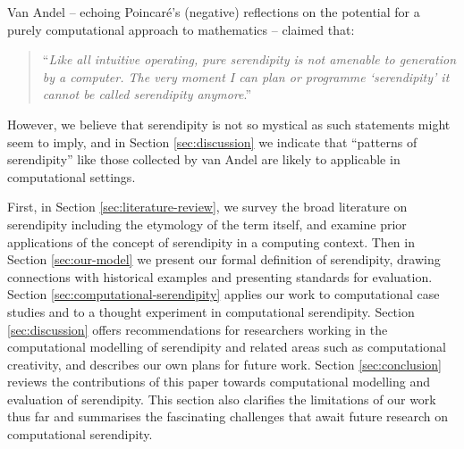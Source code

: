 Van Andel \citeyear{van1994anatomy} -- echoing Poincar\'e's
\citeyear{poincare1910creation} (negative) reflections on the potential
for a purely computational approach to mathematics -- claimed that:
\begin{quote}
``\emph{Like all intuitive operating, pure serendipity is not amenable
    to generation by a computer.  The very moment I can plan or
    programme `serendipity' it cannot be called serendipity
    anymore}.'' \cite{van1994anatomy}
\end{quote}
However, we believe that serendipity is not so mystical as such statements
might seem to imply, and in Section \ref{sec:discussion} we indicate
that ``patterns of serendipity'' like those collected by van Andel
are likely to applicable in computational settings.

First, in
Section \ref{sec:literature-review}, we survey the broad literature on
serendipity including the etymology of the term itself, and examine prior applications of the concept of serendipity in a computing context.  Then in Section \ref{sec:our-model} we present our formal
definition of serendipity, drawing connections with historical examples 
and presenting standards for evaluation.  Section
\ref{sec:computational-serendipity} applies our work to computational case studies and
to a thought experiment in computational serendipity.  Section
\ref{sec:discussion} offers recommendations for researchers working in the computational modelling of serendipity and related areas such as computational creativity, and describes our own plans for future
work.  Section \ref{sec:conclusion} reviews the contributions of this paper towards computational modelling and evaluation of serendipity.  This section also clarifies the limitations of our work thus far and summarises the fascinating challenges that await future research on computational serendipity.


